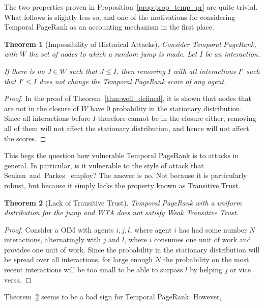\documentclass[a4paper,11pt]{book}
\newtheorem{theorem}{Theorem}
\theoremstyle{definition}
\begin{document}
The two properties proven in Proposition~\ref{prop:prop_temp_pr} are quite trivial. What follows
is slightly less so, and one of the motivations for considering Temporal PageRank as an accounting
mechanism in the first place.

\begin{theorem}[Impossibility of Historical Attacks]
    Consider Temporal PageRank, with $W$ the set of nodes to which a random jump is made. Let
    $I$ be an interaction.

    If there is no $J \in W$ such that $J \leq I$, then removing $I$ with all
    interactions $I'$ such that $I' \leq I$ does not change the Temporal PageRank
    score of any agent.
    \label{}
\end{theorem}

\begin{proof}
    In the proof of Theorem~\ref{thm:well_defined}, it is shown that nodes that are not in the closure
    of $W$ have $0$ probability in the stationary distribution. Since all interactions before $I$ therefore
    cannot be in the closure either, removing all of them will not affect the stationary distribution, and
    hence will not affect the scores.
\end{proof}

This begs the question how vulnerable Temporal PageRank is to attacks in general. In particular, is
it vulnerable to the style of attack that Seuken~and~Parkes~\cite{seuken2014sybil} employ? The
answer is no. Not because it is particularly robust, but because it simply lacks the property
known as Transitive Trust.

\begin{theorem}[Lack of Transitive Trust]
    Temporal PageRank with a uniform distribution for the jump and WTA does not satisfy Weak Transitive Trust.
    \label{thm:no_trans_trust}
\end{theorem}

\begin{proof}
    Consider a OIM with agents $i, j, l$, where agent $i$ has had some number $N$ interactions,
    alternatingly with $j$ and $l$, where $i$ consumes one unit of work and provides
    one unit of work. Since the probability in the stationary distribution will
    be spread over all interactions, for large enough $N$ the probability on the most recent
    interactions will be too small to be able to surpass $l$ by helping $j$ or vice versa.
\end{proof}

Theorem~\ref{thm:no_trans_trust} seems to be a bad sign for Temporal PageRank. However, 
\end{document}

